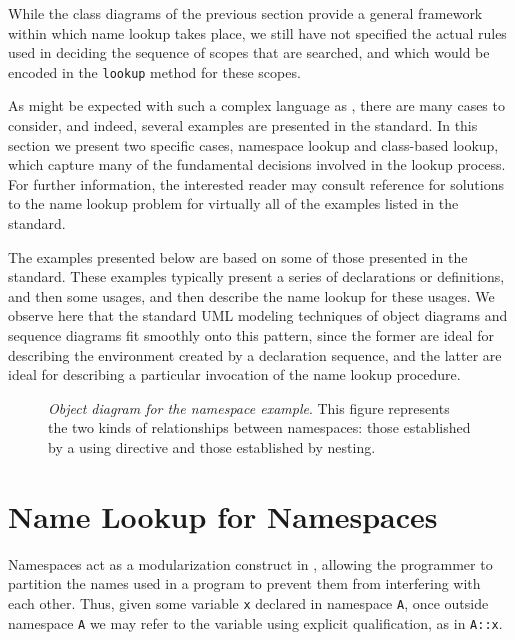 

While the class diagrams of the previous section provide a general
framework within which name lookup takes place, we still have not
specified the actual rules used in deciding the sequence of scopes
that are searched, and which would be encoded in the {\tt lookup}
method for these scopes.

As might be expected with such a complex language as {\CPP},
there are many cases
to consider, and indeed, several examples are presented in the
{\CPP} standard.  In this section we present two specific cases, namespace
lookup and class-based lookup, which capture many of the fundamental
decisions involved in the lookup process.
For further information, the interested reader may consult
reference \cite{power99} for solutions to the name lookup
problem for virtually all of the examples listed in the {\CPP} standard.



The examples presented below are based on some of those presented in
the {\CPP} standard.  These examples typically present a series of
declarations or definitions, and then some usages, and then describe
the name lookup for these usages.  We observe here that the standard UML
modeling techniques of object diagrams and sequence diagrams fit
smoothly onto this pattern, since the former are ideal for describing
the environment created by a declaration sequence, and the latter are
ideal for describing a particular invocation of the name lookup
procedure.


\begin{figure*}[t]
 \centerline{\protect
\mbox{}}
  \caption{{\em Object diagram for the namespace example}.
This figure represents the two kinds of relationships between
namespaces: those established by a using directive and those
established by nesting.
}
   \label{ns-obj}
\end{figure*}


\section{Name Lookup for Namespaces}

Namespaces act as a modularization construct in {\CPP}, allowing the
programmer to partition the names used in a program to prevent them
from interfering with each other.  Thus, given some variable {\tt x}
declared in namespace {\tt A}, once outside namespace
{\tt A} we may refer to the variable using explicit qualification, as
in {\tt A::x}.

